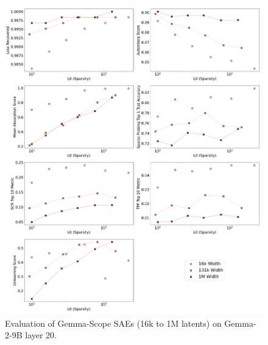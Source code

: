 \documentclass{article}
\theoremstyle{plain}
\theoremstyle{definition}
\theoremstyle{remark}
\begin{document}
\begin{figure}[h!]
    \centering
    \includegraphics[width=\columnwidth]{images/gemma-scope/plot_2x4_gemma-scope_gemma-2-9b_width_series_layer_9.png}
    \caption{Evaluation of Gemma-Scope SAEs (16k to 1M latents) on Gemma-2-9B layer 20.}
\end{figure}
\end{document}
